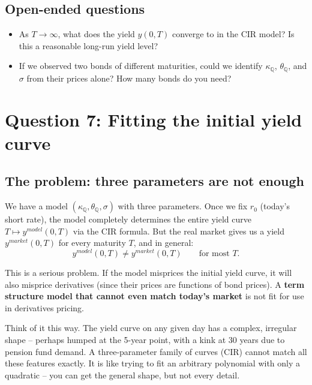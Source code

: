 \documentclass[11pt]{article}
\newcommand{\QQ}{\mathbb{Q}}
\begin{document}
\subsection*{Open-ended questions}
\begin{itemize}
  \item As $T\to\infty$, what does the yield $y(0,T)$ converge to in the CIR
  model?  Is this a reasonable long-run yield level?
  \item If we observed two bonds of different maturities, could we identify
  $\kappa_\QQ$, $\theta_\QQ$, and $\sigma$ from their prices alone?
  How many bonds do you need?
\end{itemize}

\newpage
\section{Question 7: Fitting the initial yield curve}

\subsection{The problem: three parameters are not enough}

We have a model $(\kappa_\QQ,\theta_\QQ,\sigma)$ with three parameters.
Once we fix $r_0$ (today's short rate), the model completely determines the
entire yield curve $T\mapsto y^{model}(0,T)$ via the CIR formula.  But the
real market gives us a yield $y^{market}(0,T)$ for every maturity $T$, and
in general:
\[
y^{model}(0,T) \ne y^{market}(0,T) \qquad \text{for most $T$}.
\]

This is a serious problem.  If the model misprices the initial yield curve,
it will also misprice derivatives (since their prices are functions of bond
prices).  A \textbf{term structure model that cannot even match today's market}
is not fit for use in derivatives pricing.

\begin{intuition}
Think of it this way.  The yield curve on any given day has a complex,
irregular shape -- perhaps humped at the 5-year point, with a kink at 30
years due to pension fund demand.  A three-parameter family of curves
(CIR) cannot match all these features exactly.  It is like trying to fit
an arbitrary polynomial with only a quadratic -- you can get the general
shape, but not every detail.
\end{intuition}
\end{document}
